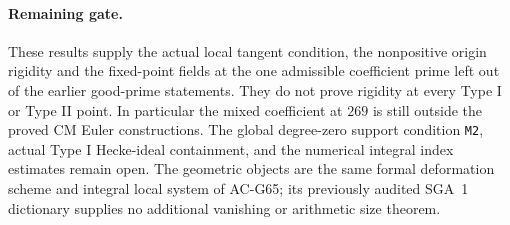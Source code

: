 \paragraph{Remaining gate.}
These results supply the actual local tangent condition,
the nonpositive origin rigidity and the fixed-point fields
at the one admissible coefficient prime left out of the
earlier good-prime statements. They do not prove rigidity
at every Type I or Type II point. In particular the mixed
coefficient at \(269\) is still outside the proved CM
Euler constructions. The global degree-zero support
condition \texttt{M2}, actual Type I Hecke-ideal containment,
and the numerical integral index estimates remain open.
The geometric objects are the same formal deformation
scheme and integral local system of AC-G65; its previously
audited SGA~1 dictionary supplies no additional vanishing
or arithmetic size theorem.
